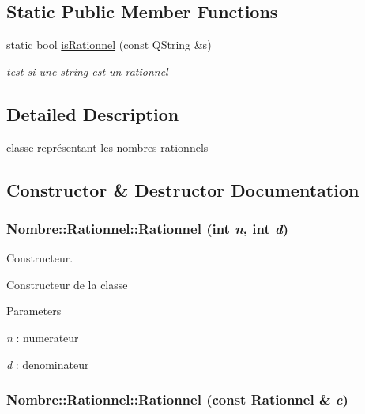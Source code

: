 \subsection*{Static Public Member Functions}
\begin{DoxyCompactItemize}
\item 
static bool \hyperlink{classNombre_1_1Rationnel_a4c6e7150cba3e9ab182361072965f209}{isRationnel} (const QString \&s)
\begin{DoxyCompactList}\small\item\em test si une string est un rationnel \item\end{DoxyCompactList}\end{DoxyCompactItemize}


\subsection{Detailed Description}
classe représentant les nombres rationnels 

\subsection{Constructor \& Destructor Documentation}
\hypertarget{classNombre_1_1Rationnel_ab0ee4363dc90feacdc79b0c78929059a}{
\subsubsection[{Rationnel}]{\setlength{\rightskip}{0pt plus 5cm}Nombre::Rationnel::Rationnel (int {\em n}, \/  int {\em d})}}
\label{classNombre_1_1Rationnel_ab0ee4363dc90feacdc79b0c78929059a}


Constructeur. 

Constructeur de la classe


\begin{DoxyParams}{Parameters}
\item[{\em n}]: numerateur \item[{\em d}]: denominateur \end{DoxyParams}
\hypertarget{classNombre_1_1Rationnel_a6271bc256512bcd61dfb7a671f6af90e}{
\subsubsection[{Rationnel}]{\setlength{\rightskip}{0pt plus 5cm}Nombre::Rationnel::Rationnel (const {\bf Rationnel} \& {\em e})}}
\label{classNombre_1_1Rationnel_a6271bc256512bcd61dfb7a671f6af90e}


